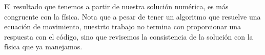 \documentclass[12pt]{article}
\begin{document}
El resultado que tenemos a partir de nuestra solución numérica, es más congruente con la física. Nota que a pesar de tener un algoritmo que resuelve una ecuación de movimiento, nuestrto trabajo no termina con proporcionar una respuesta con el código, sino que revisemos la consistencia de la solución con la física que ya manejamos.
\end{document}
